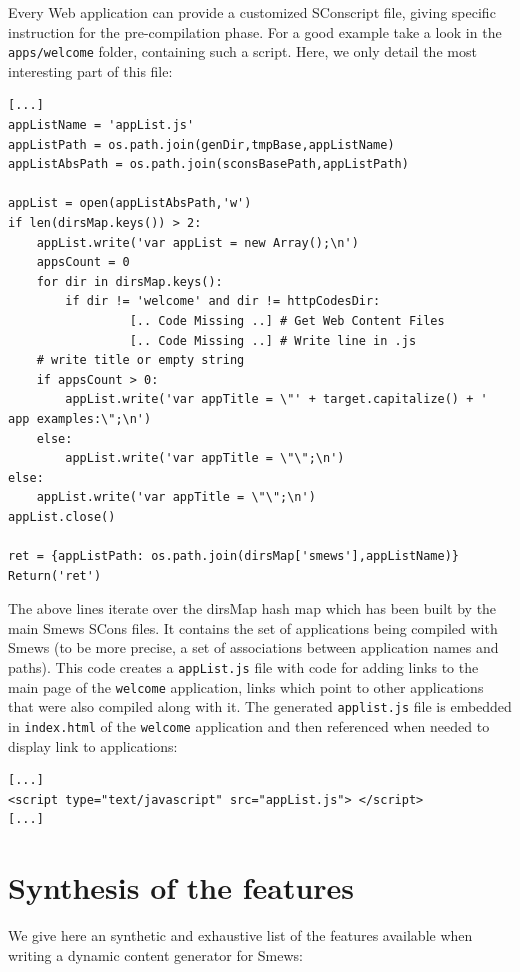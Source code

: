 \documentclass{report}
\begin{document}
Every Web application can provide a customized SConscript file, giving specific instruction for the pre-compilation phase. For a good example take a look in the \texttt{apps/welcome} folder, containing such a script. Here, we only detail the most interesting part of this file:
\lstset{language=python}
\begin{lstlisting}
[...]
appListName = 'appList.js'
appListPath = os.path.join(genDir,tmpBase,appListName)
appListAbsPath = os.path.join(sconsBasePath,appListPath)

appList = open(appListAbsPath,'w')
if len(dirsMap.keys()) > 2:
    appList.write('var appList = new Array();\n')
    appsCount = 0
    for dir in dirsMap.keys():
        if dir != 'welcome' and dir != httpCodesDir:
                 [.. Code Missing ..] # Get Web Content Files
                 [.. Code Missing ..] # Write line in .js
    # write title or empty string
    if appsCount > 0:
        appList.write('var appTitle = \"' + target.capitalize() + '
app examples:\";\n')
    else:
        appList.write('var appTitle = \"\";\n')
else:
    appList.write('var appTitle = \"\";\n')
appList.close()

ret = {appListPath: os.path.join(dirsMap['smews'],appListName)}
Return('ret')
\end{lstlisting}

The above lines iterate over the dirsMap hash map which has been built by the main Smews SCons files. It contains the set of applications being compiled with Smews (to be more precise, a set of associations between application names and paths). This code creates a \verb+appList.js+ file with code for adding links to the main page of the \verb+welcome+ application, links which point to other applications that were also compiled along with it. The generated \verb+applist.js+ file is embedded in \verb+index.html+ of the \verb+welcome+ application and then referenced when needed to display link to applications:
\lstset{language=html}
\begin{lstlisting}
[...]
<script type="text/javascript" src="appList.js"> </script>
[...]
\end{lstlisting}


\section{Synthesis of the features}

We give here an synthetic and exhaustive list of the features available when writing a dynamic content generator for Smews:
\end{document}
